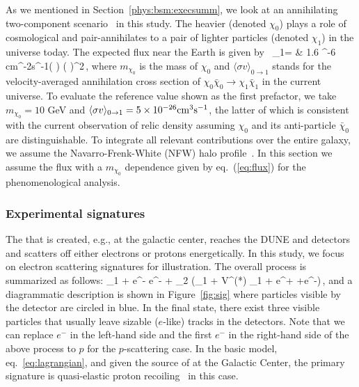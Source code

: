 As we mentioned in Section~\ref{phys:bsm:execsumm}, %
we look at an annihilating two-component  scenario~\cite{Belanger:2011ww} in this study. 
The heavier  (denoted $\chi_0$) plays a role of cosmological  and pair-annihilates to a pair of lighter  particles (denoted $\chi_1$) in the universe today. 
The expected flux near the Earth is given by~\cite{Agashe:2014yua,Giudice:2017zke, Kim:2018veo}
\bea 
{}_1= & 1.6 ^{-6} {\rm cm}^{-2}{\rm s}^{-1}\times \left( \right) 
 \times \left( \right)^2\,,
\label{eq:flux}
\eea
where $m_{\chi_0}$ is the mass of $\chi_0$ and $\langle \sigma v\rangle_{0\rightarrow 1}$ stands for the velocity-averaged annihilation cross section of $\chi_0\bar{\chi}_0 \to \chi_1\bar{\chi}_1$ in the current universe.
To evaluate the reference value shown as the first prefactor, we take $m_{\chi_0} = 10$ GeV and $\langle \sigma v\rangle_{0\rightarrow 1}=5\times 10^{-26}{\rm cm}^3{\rm s}^{-1}$, the latter of which is consistent with the current observation of  relic density assuming $\chi_0$ and its anti-particle $\bar{\chi}_0$ are distinguishable. 
To integrate all relevant contributions over the entire galaxy, we assume the Navarro-Frenk-White (NFW)  halo profile~\cite{Navarro:1995iw, Navarro:1996gj}.
In this section we assume the  flux with a $m_{\chi_0}$ dependence given by eq.~(\ref{eq:flux}) for the phenomenological analysis. 


\subsubsection{Experimental signatures}

The  that is created, e.g., at the galactic center, reaches the DUNE  and  detectors and scatters off either electrons or protons energetically. 
In this study, we focus on electron scattering signatures for illustration. 
The overall process is summarized as follows:
\bea 
\chi_1 + e^- \to e^- + \chi_2 (\to \chi_1 + V^{(*)} \to \chi_1 + e^+ +e^-)\,,
\eea
and a diagrammatic description is shown in Figure~\ref{fig:sig} where %
particles visible by the detector are circled in blue. %
In the final state, there exist three visible particles that usually leave sizable ($e$-like) tracks in the %
detectors.  
Note that we can replace $e^-$ in the left-hand side and the first $e^-$ in the right-hand side of the above process to $p$ for the $p$-scattering case.
In the basic model, eq.~\eqref{eq:lagrangian}, and given the source of  at the Galactic Center,  the primary signature is quasi-elastic proton recoiling~\cite{pscattering} in this case.

